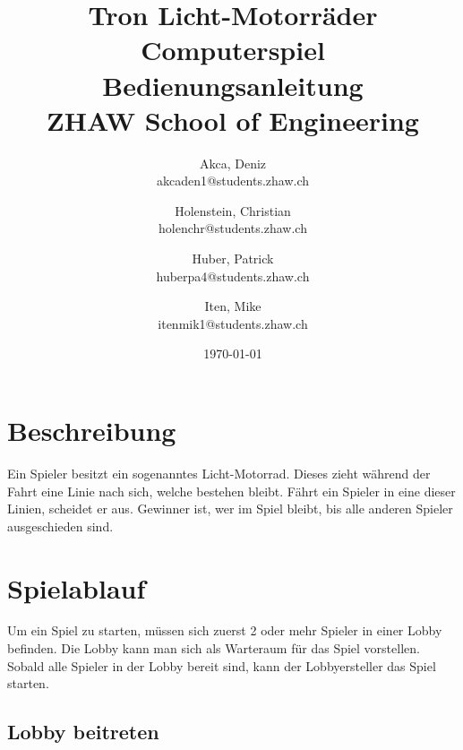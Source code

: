 \documentclass[11pt,ngerman]{article}
\begin{document}
    \title{Tron Licht-Motorräder Computerspiel\\
        \vspace{1cm}
        Bedienungsanleitung \\
        \vspace{0.5cm}
        \small{}ZHAW  School of Engineering
        \vspace{1.5cm}
    }
    \author{
        Akca, Deniz\\
        \small{akcaden1@students.zhaw.ch}
        \and
        Holenstein, Christian\\
        \small{holenchr@students.zhaw.ch}
        \and
        Huber, Patrick\\
        \small{huberpa4@students.zhaw.ch}
        \and
        Iten, Mike\\
        \small{itenmik1@students.zhaw.ch}
        \vspace{1.5cm}
    }
   \date{\today}

    \maketitle
    \newpage

    \tableofcontents
	\listoffigures
    \newpage
    
    \section{Beschreibung}
    
    Ein Spieler besitzt ein sogenanntes Licht-Motorrad. Dieses zieht während der Fahrt eine Linie nach sich, welche bestehen bleibt. Fährt ein Spieler in eine dieser Linien, scheidet er aus. Gewinner ist, wer im Spiel bleibt, bis alle anderen Spieler ausgeschieden sind.
    
   
    \section{Spielablauf}
    
    Um ein Spiel zu starten, müssen sich zuerst 2 oder mehr Spieler in einer Lobby befinden. Die Lobby kann man sich als Warteraum für das Spiel vorstellen.
    Sobald alle Spieler in der Lobby bereit sind, kann der Lobbyersteller das Spiel starten.
    
    \subsection{Lobby beitreten}
    
\end{document}
